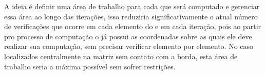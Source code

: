 A ideia é definir uma área de trabalho para cada \tile que será computado e gerenciar essa área ao longo das iterações, isso reduziria significativamente o atual número de verificações que ocorre em cada elemento do \tile e em cada iteração, pois ao partir pro processo de computação o \cluster já possui as coordenadas sobre as quais ele deve realizar sua computação, sem precisar verificar elemento por elemento. No caso \tiles localizados centralmente na matriz sem contato com a borda, esta área de trabalho seria a máxima possível sem sofrer restrições.
